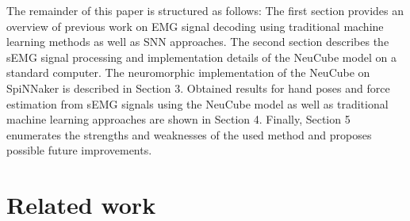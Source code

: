 \documentclass[journal,article,submit,moreauthors,pdftex,10pt,a4paper]{Definitions/mdpi}
\begin{document}
The remainder of this paper is structured as follows: The first section provides an overview of previous work on EMG signal decoding using traditional machine learning methods as well as SNN approaches. The second section describes the sEMG signal processing and implementation details of the NeuCube model on a standard computer. The neuromorphic implementation of the NeuCube on SpiNNaker is described in Section 3. Obtained results for hand poses and force estimation from sEMG signals using the NeuCube model as well as traditional machine learning approaches are shown in Section 4. Finally, Section 5 enumerates the strengths and weaknesses of the used method and proposes possible future improvements.
 
\section{Related work}
\end{document}
